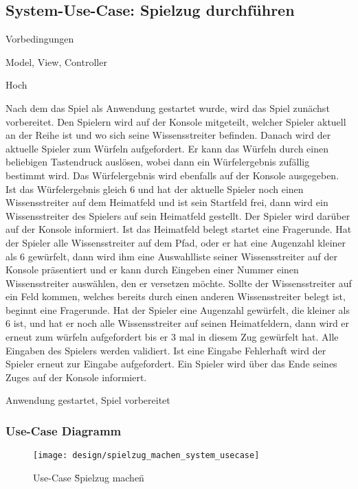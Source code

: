 \subsection{System-Use-Case: Spielzug durchführen}
\begin{labeling}[:]{Vorbedingungen}
\item [Akteure] Model, View, Controller
\item [Priorität] Hoch
\item [Beschreibung] Nach dem das Spiel als Anwendung gestartet wurde, wird das Spiel zunächst vorbereitet. Den Spielern wird auf der Konsole mitgeteilt, welcher Spieler aktuell an der Reihe ist und wo sich seine Wissensstreiter befinden. Danach wird der aktuelle Spieler zum Würfeln aufgefordert. Er kann das Würfeln durch einen beliebigen Tastendruck auslösen, wobei dann ein Würfelergebnis zufällig bestimmt wird. Das Würfelergebnis wird ebenfalls auf der Konsole ausgegeben.
Ist das Würfelergebnis gleich 6 und hat der aktuelle Spieler noch einen Wissensstreiter auf dem Heimatfeld und  ist sein Startfeld frei, dann wird ein Wissensstreiter des Spielers auf sein Heimatfeld gestellt. Der Spieler wird darüber auf der Konsole informiert. Ist das Heimatfeld belegt startet eine Fragerunde.
Hat der Spieler alle Wissensstreiter auf dem Pfad, oder er hat eine Augenzahl kleiner als 6 gewürfelt, dann wird ihm eine Auswahlliste seiner Wissensstreiter auf der Konsole präsentiert und er kann durch Eingeben einer Nummer einen Wissensstreiter auswählen, den er versetzen möchte. Sollte der Wissensstreiter auf ein Feld kommen, welches bereits durch einen anderen Wissensstreiter belegt ist, beginnt eine Fragerunde.
Hat der Spieler eine Augenzahl gewürfelt, die kleiner als 6 ist, und hat er noch alle Wissensstreiter auf seinen Heimatfeldern, dann wird er erneut zum würfeln aufgefordert bis er 3 mal in diesem Zug gewürfelt hat.
Alle Eingaben des Spielers werden validiert. Ist eine Eingabe Fehlerhaft wird der Spieler erneut zur Eingabe aufgefordert.
Ein Spieler wird über das Ende seines Zuges auf der Konsole informiert.
\item [Vorbedingungen] Anwendung gestartet, Spiel vorbereitet
\item [Offene Punkte]
\end{labeling}

\newpage
\subsubsection{Use-Case Diagramm}
\begin{figure}[h]
  \begin{center}
    \texttt{[image: design/spielzug\_machen\_system\_usecase]}
    \caption{Use-Case \"Spielzug machen\"}
  \end{center}
\end{figure}
\newpage


